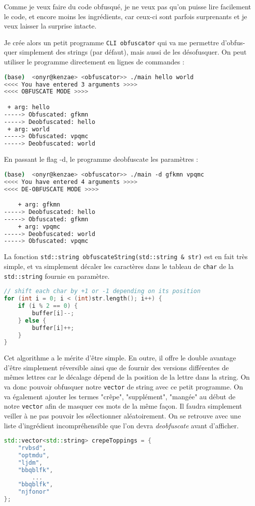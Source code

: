 \documentclass[12pt]{article} %
\begin{document}
Comme je veux faire du code obfusqué, je ne veux pas qu'on puisse lire facilement le code, et encore moins les ingrédients, car ceux-ci sont parfois surprenants et je veux laisser la surprise intacte.

Je crée alors un petit programme \verb|CLI obfuscator| qui va me permettre d'obfus-quer simplement des strings (par défaut), mais aussi de les désofusquer. On peut utiliser le programme directement en lignes de commandes :
\begin{lstlisting}[language=sh]
(base)  <onyr@kenzae> <obfuscator>> ./main hello world
<<<< You have entered 3 arguments >>>>
<<<< OBFUSCATE MODE >>>>

 + arg: hello
-----> Obfuscated: gfkmn
-----> Deobfuscated: hello
 + arg: world
-----> Obfuscated: vpqmc
-----> Deobfuscated: world
\end{lstlisting}

En passant le flag -d, le programme deobfuscate les paramètres :
\begin{lstlisting}[language=sh]
(base)  <onyr@kenzae> <obfuscator>> ./main -d gfkmn vpqmc
<<<< You have entered 4 arguments >>>>
<<<< DE-OBFUSCATE MODE >>>>

    + arg: gfkmn
-----> Deobfuscated: hello
-----> Obfuscated: gfkmn
    + arg: vpqmc
-----> Deobfuscated: world
-----> Obfuscated: vpqmc
\end{lstlisting}

La fonction \verb|std::string obfuscateString(std::string & str)| est en fait très simple, et va simplement décaler les caractères dans le tableau de \verb|char| de la \verb|std::string| fournie en paramètre.
\begin{lstlisting}[language=C++]
// shift each char by +1 or -1 depending on its position
for (int i = 0; i < (int)str.length(); i++) {
    if (i % 2 == 0) {
        buffer[i]--;
    } else {
        buffer[i]++;
    }
}
\end{lstlisting}

Cet algorithme a le mérite d'être simple. En outre, il offre le double avantage d'être simplement réversible ainsi que de fournir des versions différentes de mêmes lettres car le décalage dépend de la position de la lettre dans la string. On va donc pouvoir obfusquer notre \verb|vector| de string avec ce petit programme. On va également ajouter les termes "crêpe", "supplément", "mangée" au début de notre \verb|vector| afin de masquer ces mots de la même façon. Il faudra simplement veiller à ne pas pouvoir les sélectionner aléatoirement. On se retrouve avec une liste d'ingrédient incompréhensible que l'on devra \textit{deobfuscate} avant d'afficher.
\begin{lstlisting}[language=C++]
std::vector<std::string> crepeToppings = {
    "rvbsd",
    "optmdu",
    "ljdm",
    "bbqblfk",
        ...
    "bbqblfk",
    "njfonor"
};
\end{lstlisting}
\end{document}
